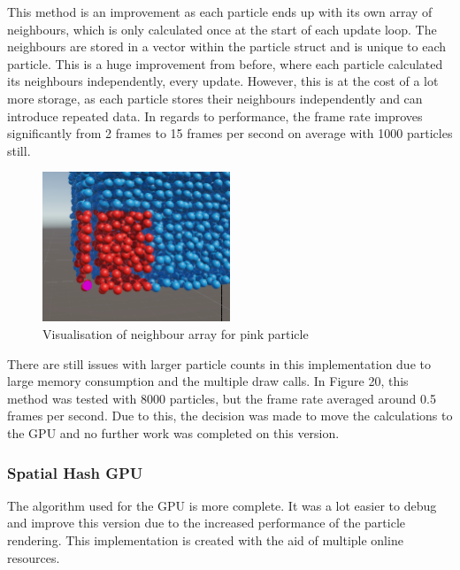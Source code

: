 \documentclass[a4paper, 12pt]{article}
\begin{document}
    This method is an improvement as each particle ends up with its own array of neighbours, which is only calculated once at the start of each update loop. The neighbours are stored in a vector within the particle struct and is unique to each particle. This is a huge improvement from before, where each particle calculated its neighbours independently, every update. However, this is at the cost of a lot more storage, as each particle stores their neighbours independently and can introduce repeated data. In regards to performance, the frame rate improves significantly from 2 frames to 15 frames per second on average with 1000 particles still.

    \begin{figure}[H]
        \begin{center}
            \includegraphics[width=0.5\textwidth]{neighboursCPU.png}
            \caption{Visualisation of neighbour array for pink particle}
        \end{center}
    \end{figure}

    There are still issues with larger particle counts in this implementation due to large memory consumption and the multiple draw calls. In Figure 20, this method was tested with 8000 particles, but the frame rate averaged around 0.5 frames per second. Due to this, the decision was made to move the calculations to the GPU and no further work was completed on this version.

    \subsubsection{Spatial Hash GPU}
    
    The algorithm used for the GPU is more complete. It was a lot easier to debug and improve this version due to the increased performance of the particle rendering. This implementation is created with the aid of multiple online resources\cite{lague}\cite{sphspatialexample}\cite{bitonicyt}\cite{bitonicparallel}.
\end{document}
